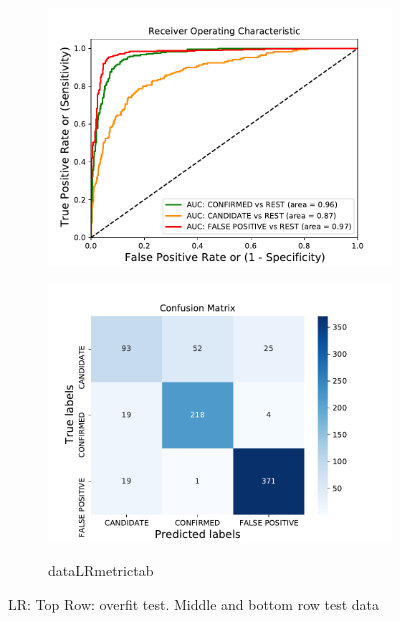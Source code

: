\begin{figure}[H]
\begin{mdframed}[linecolor=green]
\begin{subfigure}{.49\textwidth}
                \includegraphics[width = 1\textwidth]{data/LR_roc.pdf}
                \end{subfigure}
                \begin{subfigure}{.49\textwidth}
                \includegraphics[width = 1\textwidth]{data/LR_cm.pdf}
                \end{subfigure}
                \begin{subfigure}{1\textwidth}
                \csname dataLRmetrictab\endcsname
                \end{subfigure}
                \caption{LR: Top Row: overfit test. Middle and bottom row test data}
                \label{fig:data/LR_roc}
                \end{mdframed}
                \end{figure}